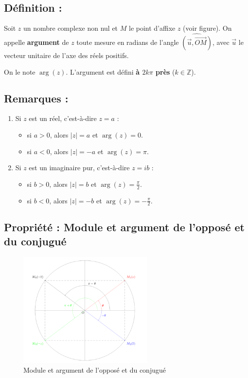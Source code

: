 \documentclass[a4paper,12pt]{article}
\begin{document}
    \subsection{Définition :}
    Soit $z$ un nombre complexe non nul et $M$ le point d’affixe $z$ (voir figure). On appelle \textbf{argument} de $z$ toute mesure en radians de l’angle $\widehat{(\vec{u}, \vec{OM})}$, avec $\vec{u}$ le vecteur unitaire de l’axe des réels positifs.

    On le note $\arg(z)$. L’argument est défini \textbf{à $2k\pi$ près} ($k \in \mathbb{Z}$).

    \subsection{Remarques :}
    \begin{enumerate}
        \item Si $z$ est un réel, c’est-à-dire $z = a$ :
        \begin{itemize}
            \item si $a > 0$, alors $|z| = a$ et $\arg(z) = 0$.
            \item si $a < 0$, alors $|z| = -a$ et $\arg(z) = \pi$.
        \end{itemize}
        \item Si $z$ est un imaginaire pur, c’est-à-dire $z = ib$ :
        \begin{itemize}
            \item si $b > 0$, alors $|z| = b$ et $\arg(z) = \frac{\pi}{2}$.
            \item si $b < 0$, alors $|z| = -b$ et $\arg(z) = -\frac{\pi}{2}$.
        \end{itemize}
    \end{enumerate}

    \subsection{Propriété : Module et argument de l’opposé et du conjugué}

    \begin{figure}[h]
        \centering
        \includegraphics[width=0.6\textwidth]{figure_exemple_trigo.png}
        \caption{Module et argument de l’opposé et du conjugué}
        \label{fig:figure_exemple_trigo}
    \end{figure}
\end{document}
